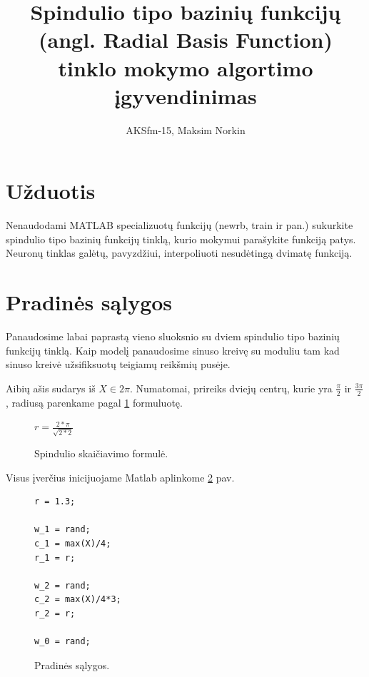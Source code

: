\documentclass[11pt, a4paper, lithuanian]{article}
\author{AKSfm-15, Maksim Norkin}
\title{Spindulio tipo bazinių funkcijų (angl. Radial Basis Function) tinklo mokymo algortimo įgyvendinimas}
\begin{document}
    \maketitle

    \section{Užduotis}

    Nenaudodami MATLAB specializuotų funkcijų (newrb, train ir pan.) sukurkite spindulio tipo bazinių funkcijų tinklą, kurio mokymui parašykite funkciją patys. Neuronų tinklas galėtų, pavyzdžiui, interpoliuoti nesudėtingą dvimatę funkciją.

    \section{Pradinės sąlygos}

    Panaudosime labai paprastą vieno sluoksnio su dviem spindulio tipo bazinių funkcijų tinklą. Kaip modelį panaudosime sinuso kreivę su moduliu tam kad sinuso kreivė užsifiksuotų teigiamų reikšmių pusėje.

    Aibių ašis sudarys iš $ X \in 2 \pi $. Numatomai, prireiks dviejų centrų, kurie yra $\frac{\pi}{2}$ ir $\frac{3\pi}{2}$, radiusą parenkame pagal \ref{formula:spindulio_skaiciavimo_formule} formuluotę.

    \begin{figure}[h]
        \centering
        \caption{Spindulio skaičiavimo formulė.}
        \label{formula:spindulio_skaiciavimo_formule}
        \begin{math}
            r = \frac{2*\pi}{\sqrt{2*2}}
        \end{math}
    \end{figure}

    Visus įverčius inicijuojame Matlab aplinkome \ref{code:pradines_salygos} pav.

    \begin{figure}[h]
      \centering
      \caption{Pradinės sąlygos.}
      \label{code:pradines_salygos}
      \begin{lstlisting}
r = 1.3;

w_1 = rand;
c_1 = max(X)/4;
r_1 = r;

w_2 = rand;
c_2 = max(X)/4*3;
r_2 = r;

w_0 = rand;
      \end{lstlisting}
    \end{figure}
\end{document}
